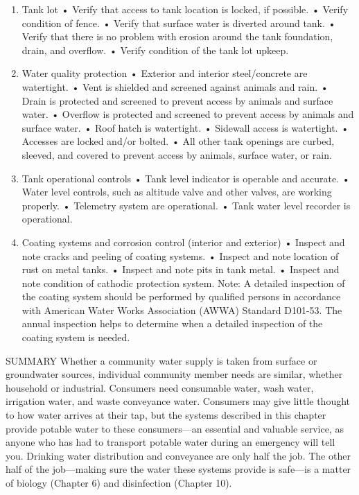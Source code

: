 \documentclass{article}
\begin{document}
\begin{enumerate}
\def\labelenumi{\arabic{enumi}.}
\tightlist
\item
  Tank lot • Verify that access to tank location is locked, if possible.
  • Verify condition of fence. • Verify that surface water is diverted
  around tank. • Verify that there is no problem with erosion around the
  tank foundation, drain, and overflow. • Verify condition of the tank
  lot upkeep.
\item
  Water quality protection • Exterior and interior steel/concrete are
  watertight. • Vent is shielded and screened against animals and rain.
  • Drain is protected and screened to prevent access by animals and
  surface water. • Overflow is protected and screened to prevent access
  by animals and surface water. • Roof hatch is watertight. • Sidewall
  access is watertight. • Accesses are locked and/or bolted. • All other
  tank openings are curbed, sleeved, and covered to prevent access by
  animals, surface water, or rain.
\item
  Tank operational controls • Tank level indicator is operable and
  accurate. • Water level controls, such as altitude valve and other
  valves, are working properly. • Telemetry system are operational. •
  Tank water level recorder is operational.
\item
  Coating systems and corrosion control (interior and exterior) •
  Inspect and note cracks and peeling of coating systems. • Inspect and
  note location of rust on metal tanks. • Inspect and note pits in tank
  metal. • Inspect and note condition of cathodic protection system.
  Note: A detailed inspection of the coating system should be performed
  by qualified persons in accordance with American Water Works
  Association (AWWA) Standard D101-53. The annual inspection helps to
  determine when a detailed inspection of the coating system is needed.
\end{enumerate}

SUMMARY Whether a community water supply is taken from surface or
groundwater sources, individual community member needs are similar,
whether household or industrial. Consumers need consumable water, wash
water, irrigation water, and waste conveyance water. Consumers may give
little thought to how water arrives at their tap, but the systems
described in this chapter provide potable water to these consumers---an
essential and valuable service, as anyone who has had to transport
potable water during an emergency will tell you. Drinking water
distribution and conveyance are only half the job. The other half of the
job---making sure the water these systems provide is safe---is a matter
of biology (Chapter 6) and disinfection (Chapter 10).
\end{document}
